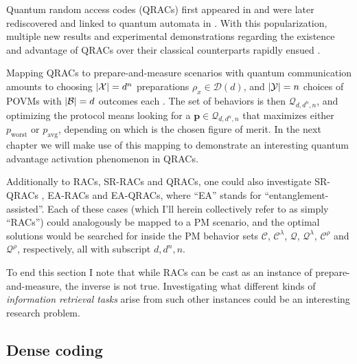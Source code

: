             Quantum random access codes (QRACs) first appeared in \cite{wiesner1983conjugate} and were later rediscovered and linked to quantum automata in \cite{ambainis_qracsoriginal_1999}. With this popularization, multiple new results and experimental demonstrations regarding the existence and advantage of QRACs over their classical counterparts rapidly ensued \cite{nayak1999optimal,ambainis2002dense,hayashi_41qracs_2006,ambainis_srqracs_2009,spekkens2009preparation,pawlowski_pamqkd_2011}.

            Mapping QRACs to prepare-and-measure scenarios with quantum communication amounts to choosing $\abs{\mathcal{X}} = d^n$ preparations $\rho_{x} \in \mathcal{D}(d)$, and $\abs{\mathcal{Y}} = n$  choices of POVMs with $\abs{\mathcal{B}} = d$ outcomes each \cite{de_vicente_bound_2019}. The set of behaviors is then $\mathcal{Q}_{d,d^n,n}$, and optimizing the protocol means looking for a $\mathbf{p} \in \mathcal{Q}_{d,d^n,n}$ that maximizes either $p_{\text{worst}}$ or $p_{\text{avg}}$, depending on which is the chosen figure of merit. In the next chapter we will make use of this mapping to demonstrate an interesting quantum advantage activation phenomenon in QRACs.

            Additionally to RACs, SR-RACs and QRACs, one could also investigate SR-QRACs \cite{ambainis_srqracs_2009}, EA-RACs \cite{pawlowski_earacs_2010} and EA-QRACs, where ``EA'' stands for ``entanglement-assisted''. Each of these cases (which I'll herein collectively refer to as simply ``RACs'') could analogously be mapped to a PM scenario, and the optimal solutions would be searched for inside the PM behavior sets $\mathcal{C}$, $\mathcal{C}^\lambda$, $\mathcal{Q}$, $\mathcal{Q}^\lambda$, $\mathcal{C}^\rho$ and $\mathcal{Q}^\rho$, respectively, all with subscript $d,d^n,n$.

            To end this section I note that while RACs can be cast as an instance of prepare-and-measure, the inverse is not true. Investigating what different kinds of \emph{information retrieval tasks} \cite{emeriau_torpedo_2020} arise from such other instances could be an interesting research problem.

        \subsection{Dense coding}
        \label{sec:dense-coding}

